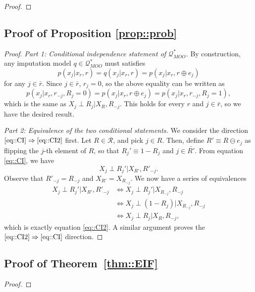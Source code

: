 \documentclass[aos, preprint]{imsart}
\theoremstyle{plain}
\theoremstyle{definition}
\newcommand{\E}{\mbox{$\mathbb{E}$}}
\begin{document}
\begin{appendix}
\begin{proof}
\end{proof}


\subsection{Proof of Proposition \ref{prop::prob}}
\begin{proof}

	\emph{Part 1: Conditional independence statement of $\mathcal{Q}^*_{MOO}$.}
	By construction, any imputation model $q\in\mathcal{Q}^*_{MOO}$ must satisfies
	$$
	p (x_j|x_r, r) = q(x_j|x_r, r) = p(x_j|x_r, r\oplus e_j)
	$$
	for any $j\in \bar r$.
	Since $j\in \bar r$, $r_j = 0$, so the above equality can be written as
	$$
	p(x_j|x_r, r_{-j}, R_j = 0) = p(x_j|x_r, r\oplus e_j) = p(x_j|x_r, r_{-j}, R_j = 1),
	$$
	which is the same as $X_j \perp R_j | X_{R}, R_{-j}$. 
	This holds for every $r$ and $j\in \bar r$, so we have the desired result.
	
	
		
	\emph{Part 2: Equivalence of the two conditional statements.} 
	We consider the direction $\eqref{eq::CI} \Rightarrow \eqref{eq::CI2}$ first.  Let $R\in\mathcal{R}$, and pick $j\in R$.  Then, define $R' \equiv R \ominus e_j$ as flipping the $j$-th element of $R$, so that $R_j' \equiv 1-R_j$ and $j\in \bar{R'}$.  From equation \eqref{eq::CI}, we have
		$$X_j \perp R_j' | X_{R'}, R'_{-j}.$$
		Observe that $R'_{-j} = R_{-j}$ and $X_{R'} = X_{R_{-j}}$.  We now have a series of equivalences
		\begin{align*}
			X_j \perp R_j' | X_{R'}, R'_{-j} &\iff X_j \perp R_j' | X_{R_{-j}}, R_{-j} \\
			&\iff X_j \perp (1-R_j) | X_{R_{-j}}, R_{-j} \\
			&\iff X_j \perp R_j | X_{R}, R_{-j},
		\end{align*}
		which is exactly equation \eqref{eq::CI2}.
		A similar argument proves the $\eqref{eq::CI2} \Rightarrow \eqref{eq::CI}$ direction.
	\end{proof}




\subsection{Proof of Theorem~\ref{thm::EIF}}
	\begin{proof}


\end{proof}
\end{appendix}
\end{document}
